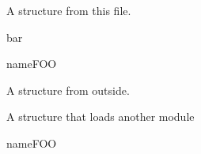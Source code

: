 \documentclass[minimal]{omdoc}
\begin{document}


A structure from this file.
\begin{modsig}{bar}
\begin{gstructure}{name}{FOO}
\end{gstructure}
\end{modsig}

A structure from outside. 
\begin{module}[id=baz]
A structure that loads another module
\begin{sstructure}[../modules]{name}{FOO}
\end{sstructure}
\end{module}
\end{document}
